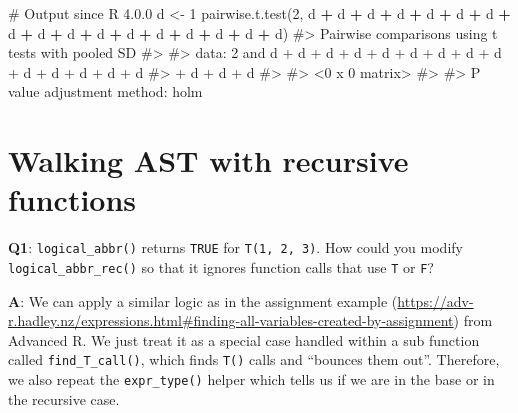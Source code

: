 \documentclass[
]{krantz}
\makeatletter
\newenvironment{Shaded}{\begin{snugshade}}{\end{snugshade}}
\newcommand{\CommentTok}[1]{\textcolor[rgb]{0.56,0.35,0.01}{\textit{#1}}}
\newcommand{\DecValTok}[1]{\textcolor[rgb]{0.00,0.00,0.81}{#1}}
\newcommand{\KeywordTok}[1]{\textcolor[rgb]{0.13,0.29,0.53}{\textbf{#1}}}
\newcommand{\NormalTok}[1]{#1}
\newcommand{\OperatorTok}[1]{\textcolor[rgb]{0.81,0.36,0.00}{\textbf{#1}}}
\newcommand{\StringTok}[1]{\textcolor[rgb]{0.31,0.60,0.02}{#1}}
\renewcommand{\href}[2]{#2 (\url{#1})}
\newenvironment{kframe}{%
\medskip{}
\setlength{\fboxsep}{.8em}
 \def\at@end@of@kframe{}%
 \ifinner\ifhmode%
  \def\at@end@of@kframe{\end{minipage}}%
  \begin{minipage}{\columnwidth}%
 \fi\fi%
 \def\FrameCommand##1{\hskip\@totalleftmargin \hskip-\fboxsep
 \colorbox{shadecolor}{##1}\hskip-\fboxsep
     \hskip-\linewidth \hskip-\@totalleftmargin \hskip\columnwidth}%
 \MakeFramed {\advance\hsize-\width
   \@totalleftmargin\z@ \linewidth\hsize
   \@setminipage}}%
 {\par\unskip\endMakeFramed%
 \at@end@of@kframe}
\renewenvironment{Shaded}{\begin{kframe}}{\end{kframe}}
\renewcommand{\KeywordTok} [1]{\textcolor[rgb]{0.00,0.44,0.13}{{#1}}}
\renewcommand{\DecValTok}  [1]{\textcolor[rgb]{0.25,0.63,0.44}{{#1}}}
\renewcommand{\StringTok}  [1]{\textcolor[rgb]{0.25,0.44,0.63}{{#1}}}
\renewcommand{\CommentTok} [1]{\textcolor[rgb]{0.38,0.63,0.69}{{#1}}}
\renewcommand{\NormalTok}  [1]{{#1}}
\makeatother
\begin{document}
\begin{Shaded}
\begin{Highlighting}[]
\CommentTok{# Output since R 4.0.0}
\NormalTok{d <-}\StringTok{ }\DecValTok{1}
\KeywordTok{pairwise.t.test}\NormalTok{(}\DecValTok{2}\NormalTok{, d }\OperatorTok{+}\StringTok{ }\NormalTok{d }\OperatorTok{+}\StringTok{ }\NormalTok{d }\OperatorTok{+}\StringTok{ }\NormalTok{d }\OperatorTok{+}\StringTok{ }\NormalTok{d }\OperatorTok{+}\StringTok{ }\NormalTok{d }\OperatorTok{+}\StringTok{ }\NormalTok{d }\OperatorTok{+}\StringTok{ }\NormalTok{d }\OperatorTok{+}\StringTok{ }
\StringTok{                  }\NormalTok{d }\OperatorTok{+}\StringTok{ }\NormalTok{d }\OperatorTok{+}\StringTok{ }\NormalTok{d }\OperatorTok{+}\StringTok{ }\NormalTok{d }\OperatorTok{+}\StringTok{ }\NormalTok{d }\OperatorTok{+}\StringTok{ }\NormalTok{d }\OperatorTok{+}\StringTok{ }\NormalTok{d }\OperatorTok{+}\StringTok{ }\NormalTok{d }\OperatorTok{+}\StringTok{ }\NormalTok{d)}
\CommentTok{#>  Pairwise comparisons using t tests with pooled SD }
\CommentTok{#> }
\CommentTok{#> data:  2 and d + d + d + d + d + d + d + d + d + d + d + d + d + d}
\CommentTok{#> + d + d + d}
\CommentTok{#> }
\CommentTok{#> <0 x 0 matrix>}
\CommentTok{#> }
\CommentTok{#> P value adjustment method: holm }
\end{Highlighting}
\end{Shaded}

\hypertarget{ast-funs}{%
\section{Walking AST with recursive functions}\label{ast-funs}}

\textbf{{Q1}}: \texttt{logical\_abbr()} returns \texttt{TRUE} for \texttt{T(1,\ 2,\ 3)}. How could you modify \texttt{logical\_abbr\_rec()} so that it ignores function calls that use \texttt{T} or \texttt{F}?

\textbf{{A}}: We can apply a similar logic as in the \href{https://adv-r.hadley.nz/expressions.html\#finding-all-variables-created-by-assignment}{assignment example} from Advanced R. We just treat it as a special case handled within a sub function called \texttt{find\_T\_call()}, which finds \texttt{T()} calls and ``bounces them out''. Therefore, we also repeat the \texttt{expr\_type()} helper which tells us if we are in the base or in the recursive case.
\end{document}
